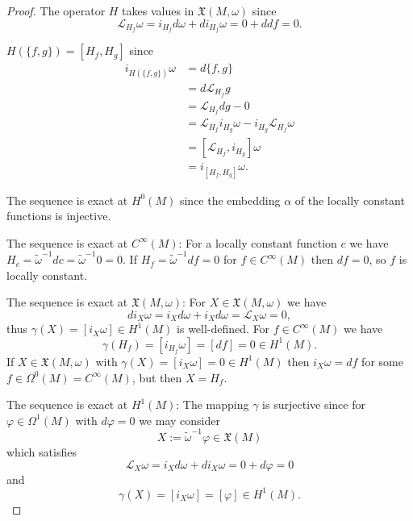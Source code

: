 \documentclass{article}
\numberwithin{theorem}{section}
\theoremstyle{definition}
\begin{document}
\begin{proof}
    The operator $H$ takes values in $\mathfrak{X}(M, \omega)$ since
    \[
    \mathcal{L}_{H_f} \omega = i_{H_f} d\omega + d i_{H_f} \omega = 0 + d df = 0.
    \]

    $H(\{f, g\}) = [H_f, H_g] $ since 
    \begin{equation}
        \begin{split}
            i_{H(\{f, g\})} \omega &= d\{f, g\} \\
            &= d \mathcal{L}_{H_f} g \\
            &= \mathcal{L}_{H_f} dg - 0 \\
            &= \mathcal{L}_{H_f} i_{H_g} \omega - i_{H_g} \mathcal{L}_{H_f} \omega \\
            &= [\mathcal{L}_{H_f}, i_{H_g}] \omega \\
            &= i_{[H_f, H_g]} \omega.
        \end{split}
    \end{equation}

    The sequence is exact at $H^0(M)$ since the embedding $\alpha$ of the locally constant functions is injective.

    The sequence is exact at $C^\infty(M)$: For a locally constant function $c$ we have $H_c = \tilde{\omega}^{-1} dc = \tilde{\omega}^{-1} 0 = 0.$ If $H_f = \tilde{\omega}^{-1} df = 0$ for $f \in C^\infty(M)$ then $df = 0$, so $f$ is locally constant.

    The sequence is exact at $\mathfrak{X}(M, \omega)$: For $X \in \mathfrak{X}(M, \omega)$ we have 
    \[
    d i_X \omega = i_X d\omega + i_X d\omega = \mathcal{L}_X \omega = 0,
    \]
    thus $\gamma(X) = [i_X \omega] \in H^1(M)$ is well-defined. For $f \in C^\infty(M)$ we have 
    \[
    \gamma(H_f) = [i_{H_f} \omega] = [df] = 0 \in H^1(M).
    \]
    If $X \in \mathfrak{X}(M, \omega)$ with $\gamma(X) = [i_X \omega] = 0 \in H^1(M)$ then $i_X \omega = df$ for some $f \in \Omega^0(M) = C^\infty(M)$, but then $X = H_f$.

    The sequence is exact at $H^1(M)$: The mapping $\gamma$ is surjective since for $\varphi \in \Omega^1(M)$ with $d\varphi = 0$ we may consider 
    \[
    X := \tilde{\omega}^{-1} \varphi \in \mathfrak{X}(M)
    \]
    which satisfies 
    \[
    \mathcal{L}_X \omega = i_X d\omega + d i_X \omega = 0 + d\varphi = 0
    \]
    and 
    \[
    \gamma(X) = [i_X \omega] = [\varphi] \in H^1(M).
    \]


\end{proof}
\end{document}
